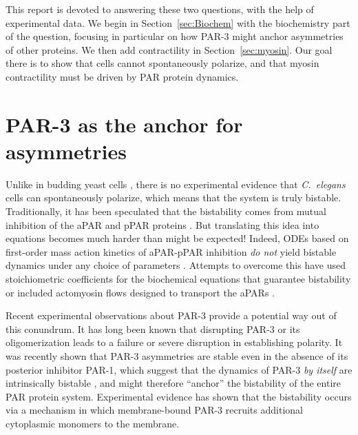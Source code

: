 \documentclass[11pt]{article}
\newcommand{\6}[1]{#1_{\text{6}}}
\newcommand{\3}[1]{#1_{\text{3}}}
\begin{document}
This report is devoted to answering these two questions, with the help of experimental data. We begin in Section\ \ref{sec:Biochem} with the biochemistry part of the question, focusing in particular on how PAR-3 might anchor asymmetries of other proteins. We then add contractility in Section\ \ref{sec:myosin}. Our goal there is to show that cells cannot spontaneously polarize, and that myosin contractility must be driven by PAR protein dynamics. 

\section{PAR-3 as the anchor for asymmetries \label{sec:Biochem}}
Unlike in budding yeast cells \cite{mogilner2012cell}, there is no experimental evidence that \emph{C.\ elegans} cells can spontaneously polarize, which means that the system is truly bistable. Traditionally, it has been speculated that the bistability comes from mutual inhibition of the aPAR and pPAR proteins \cite{halatek2018self, trong2014parameter}. But translating this idea into equations becomes much harder than might be expected! Indeed, ODEs based on first-order mass action kinetics of aPAR-pPAR inhibition \emph{do not} yield bistable dynamics under any choice of parameters \cite{dawes20113}. Attempts to overcome this have used stoichiometric coefficients for the biochemical equations that guarantee bistability \cite{goehring2011polarization, gross2019guiding} or included actomyosin flows designed to transport the aPARs \cite{TH2008}.

Recent experimental observations about PAR-3 provide a potential way out of this conundrum. It has long been known that disrupting PAR-3 \cite{etemad1995asymmetrically} or its oligomerization \cite{dickinson2017single} leads to a failure or severe disruption in establishing polarity. It was recently shown that PAR-3 asymmetries are stable even in the absence of its posterior inhibitor PAR-1, which suggest that the dynamics of PAR-3 \emph{by itself} are intrinsically bistable \cite{lang2023oligomerization}, and might therefore ``anchor'' the bistability of the entire PAR protein system. Experimental evidence has shown that the bistability occurs via a mechanism in which membrane-bound PAR-3 recruits additional cytoplasmic monomers to the membrane. %
\end{document}
